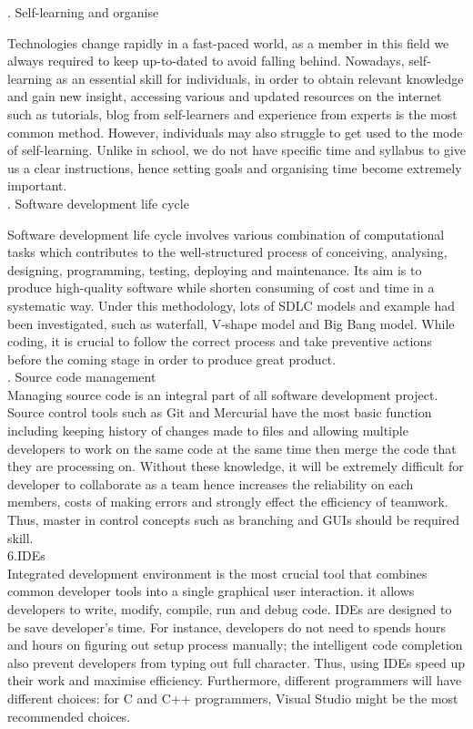 \documentclass[a4paper, 11pt]{report}
\begin{document}
. Self-learning and organise

\noindent Technologies change rapidly in a fast-paced world, as a member in this field we always required to keep up-to-dated to avoid falling behind. Nowadays, self-learning as an essential skill for individuals, in order to obtain relevant knowledge and gain new insight, accessing various and updated resources on the internet such as tutorials, blog from self-learners and experience from experts is the most common method. However, individuals may also struggle to get used to the mode of self-learning. Unlike in school, we do not have specific time and syllabus to give us a clear instructions, hence setting goals and organising time become extremely important.\\

. Software development life cycle

\noindent Software development life cycle involves various combination of computational tasks which contributes to the well-structured process of conceiving, analysing, designing, programming, testing, deploying and maintenance. Its aim is to produce high-quality software while shorten consuming of cost and time in a systematic way. Under this methodology, lots of SDLC models and example had been investigated, such as waterfall, V-shape model and Big Bang model. While coding, it is crucial to follow the correct process and take preventive actions before the coming stage in order to produce great product.\\  

. Source code management\\
\noindent Managing source code is an integral part of all software development project.\cite{SDM} Source control tools such as Git and Mercurial have the most basic function including keeping history of changes made to files  and allowing multiple developers to work on the same code at the same time then merge the code that they are processing on. Without these knowledge, it will be extremely difficult for developer to collaborate as a team hence increases the reliability on each members, costs of making errors and strongly effect the efficiency of teamwork. Thus, master in control concepts such as branching and GUIs should be required skill.\cite{Git-IDE-SQL}\\

\noindent 6.IDEs\\
\noindent Integrated development environment is the most crucial tool that combines common developer tools into a single graphical user interaction. it allows developers to write, modify, compile, run and debug code. IDEs are designed to be save developer's time. For instance, developers do not need to spends hours and hours on figuring out setup process manually; the intelligent code completion also prevent developers from typing out full character. Thus, using IDEs speed up their work and maximise efficiency.\cite{IDE_intro} Furthermore, different programmers will have different choices: for C and C++ programmers, Visual Studio might be the most recommended choices.\cite{Git-IDE-SQL}\\  
\end{document}
